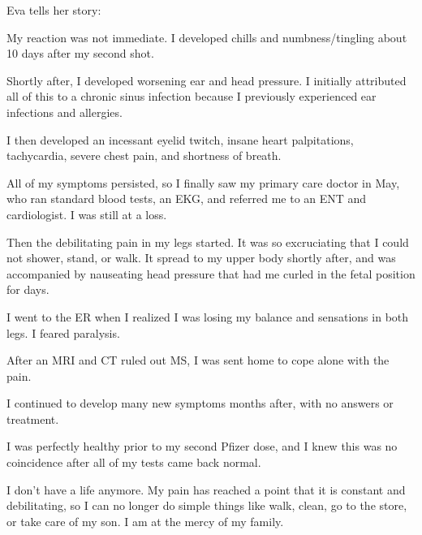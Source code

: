 Eva tells her story:

My reaction was not immediate. I developed chills and numbness/tingling about 10
days after my second shot.

Shortly after, I developed worsening ear and head pressure. I initially
attributed all of this to a chronic sinus infection because I previously
experienced ear infections and allergies.

I then developed an incessant eyelid twitch, insane heart palpitations,
tachycardia, severe chest pain, and shortness of breath.

All of my symptoms persisted, so I finally saw my primary care doctor in May,
who ran standard blood tests, an EKG, and referred me to an ENT and
cardiologist. I was still at a loss.

Then the debilitating pain in my legs started. It was so excruciating that I
could not shower, stand, or walk. It spread to my upper body shortly after, and
was accompanied by nauseating head pressure that had me curled in the fetal
position for days.

I went to the ER when I realized I was losing my balance and sensations in both
legs. I feared paralysis.

After an MRI and CT ruled out MS, I was sent home to cope alone with the pain.

I continued to develop many new symptoms months after, with no answers or
treatment.

I was perfectly healthy prior to my second Pfizer dose, and I knew this was no
coincidence after all of my tests came back normal.

I don’t have a life anymore. My pain has reached a point that it is constant and
debilitating, so I can no longer do simple things like walk, clean, go to the
store, or take care of my son. I am at the mercy of my family.
